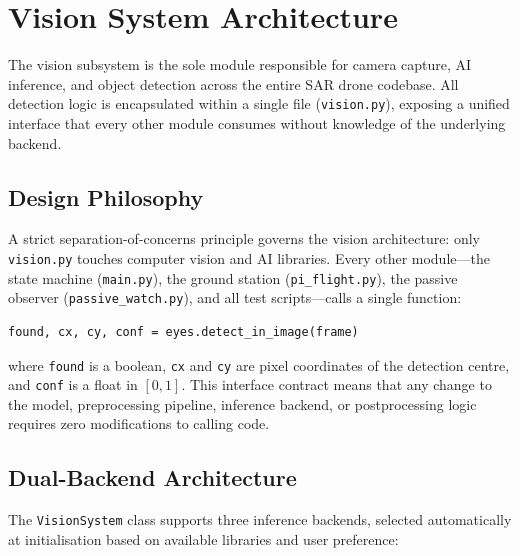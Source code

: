 
\section{Vision System Architecture}
\label{sec:vision-arch}

The vision subsystem is the sole module responsible for camera capture, AI inference,
and object detection across the entire SAR drone codebase. All detection logic is
encapsulated within a single file (\texttt{vision.py}), exposing a unified interface
that every other module consumes without knowledge of the underlying backend.

\subsection{Design Philosophy}

A strict separation-of-concerns principle governs the vision architecture: only
\texttt{vision.py} touches computer vision and AI libraries. Every other module---the
state machine (\texttt{main.py}), the ground station (\texttt{pi\_flight.py}), the
passive observer (\texttt{passive\_watch.py}), and all test scripts---calls a single
function:

\begin{verbatim}
found, cx, cy, conf = eyes.detect_in_image(frame)
\end{verbatim}

\noindent where \texttt{found} is a boolean, \texttt{cx} and \texttt{cy} are pixel
coordinates of the detection centre, and \texttt{conf} is a float in $[0, 1]$.
This interface contract means that any change to the model, preprocessing pipeline,
inference backend, or postprocessing logic requires zero modifications to calling code.

\subsection{Dual-Backend Architecture}

The \texttt{VisionSystem} class supports three inference backends, selected
automatically at initialisation based on available libraries and user preference:

